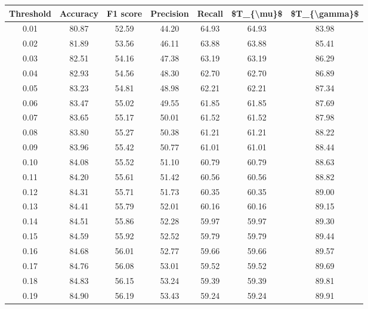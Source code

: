 \begin{tabular}{|c|c|c|c|c|c|c|}
\hline
 Threshold &  Accuracy &  F1 score &  Precision &  Recall &  \$T\_\{\textbackslash mu\}\$ &  \$T\_\{\textbackslash gamma\}\$ \\
\hline
      0.01 &     80.87 &     52.59 &      44.20 &   64.93 &      64.93 &         83.98 \\
      0.02 &     81.89 &     53.56 &      46.11 &   63.88 &      63.88 &         85.41 \\
      0.03 &     82.51 &     54.16 &      47.38 &   63.19 &      63.19 &         86.29 \\
      0.04 &     82.93 &     54.56 &      48.30 &   62.70 &      62.70 &         86.89 \\
      0.05 &     83.23 &     54.81 &      48.98 &   62.21 &      62.21 &         87.34 \\
      0.06 &     83.47 &     55.02 &      49.55 &   61.85 &      61.85 &         87.69 \\
      0.07 &     83.65 &     55.17 &      50.01 &   61.52 &      61.52 &         87.98 \\
      0.08 &     83.80 &     55.27 &      50.38 &   61.21 &      61.21 &         88.22 \\
      0.09 &     83.96 &     55.42 &      50.77 &   61.01 &      61.01 &         88.44 \\
      0.10 &     84.08 &     55.52 &      51.10 &   60.79 &      60.79 &         88.63 \\
      0.11 &     84.20 &     55.61 &      51.42 &   60.56 &      60.56 &         88.82 \\
      0.12 &     84.31 &     55.71 &      51.73 &   60.35 &      60.35 &         89.00 \\
      0.13 &     84.41 &     55.79 &      52.01 &   60.16 &      60.16 &         89.15 \\
      0.14 &     84.51 &     55.86 &      52.28 &   59.97 &      59.97 &         89.30 \\
      0.15 &     84.59 &     55.92 &      52.52 &   59.79 &      59.79 &         89.44 \\
      0.16 &     84.68 &     56.01 &      52.77 &   59.66 &      59.66 &         89.57 \\
      0.17 &     84.76 &     56.08 &      53.01 &   59.52 &      59.52 &         89.69 \\
      0.18 &     84.83 &     56.15 &      53.24 &   59.39 &      59.39 &         89.81 \\
      0.19 &     84.90 &     56.19 &      53.43 &   59.24 &      59.24 &         89.91 \\

\end{tabular}
